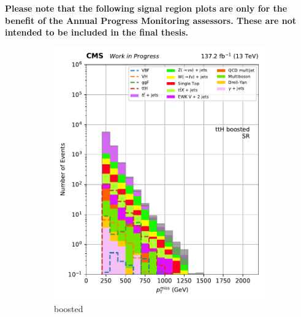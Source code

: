 \textbf{Please note that the following signal region plots are only for the benefit of the Annual Progress Monitoring assessors. These are not intended to be included in the final thesis.}

\begin{figure}[htbp]
    \centering
    \begin{subfigure}[b]{0.24\textwidth}
        \includegraphics[width=\textwidth]{figures/region_plots/2016to18/region_0/ttH_boosted.pdf}
        \caption{\ttH boosted}
    \end{subfigure}
    \hfill
    \begin{subfigure}[b]{0.24\textwidth}

\end{subfigure}
\end{figure}
